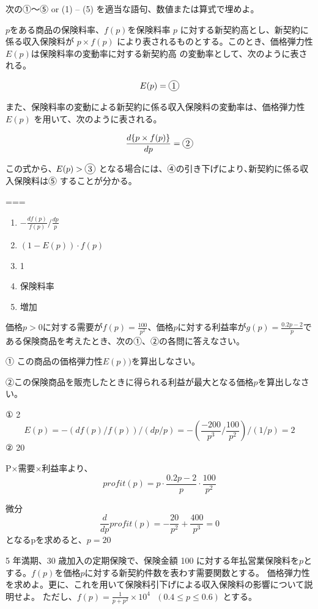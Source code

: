 \documentclass[report,gutter=10mm,fore-edge=10mm,uplatex,dvipdfmx]{jlreq}
\begin{document}

次の①～⑤ or (1) -- (5) を適当な語句、数値または算式で埋めよ。

$p$をある商品の保険料率、$f(p)$を保険料率 $p$
に対する新契約高とし、新契約に係る収入保険料が $p \times f(p)$
により表されるものとする。このとき、価格弾力性$E(p)$は保険料率の変動率に対する新契約高
の変動率として、次のように表される。

$$E(p) =  \cir{1} $$

また、保険料率の変動による新契約に係る収入保険料の変動率は、価格弾力性
$E(p)$ を用いて、次のように表される。

$$\frac{d\{p \times f(p)\} }{dp}= \cir{2}$$

この式から､ $E(p) > \cir{3}$ となる場合には、④の引き下げにより､新契約に係る収入保険料は⑤ することが分かる。

===


\begin{enumerate}
\tightlist
\item
  $-\frac{df(p)}{f(p)} / \frac{dp}{p}$
\item
  $(1-E(p))\cdot f(p)$
\item
  1
\item
  保険料率
\item
  増加
\end{enumerate}


価格$p>0$に対する需要が$f(p)=\frac{100}{p^2}$、価格$p$に対する利益率が$g(p)=\frac{0.2p-2}{p}$である保険商品を考えたとき、次の①、②の各問に答えなさい。

① この商品の価格弾力性$E(p))$を算出しなさい。 

②この保険商品を販売したときに得られる利益が最大となる価格$p$を算出しなさい。

① 2
$$ E(p) = -(df(p)/f(p)) / (dp/p) = -(\frac{-200}{p^3}/\frac{100}{p^2})/(1/p) = 2$$
② 20 

P×需要×利益率より、
$$profit(p)=p\cdot\frac{0.2p-2}{p}\cdot\frac{100}{p^2}$$

微分 $$\frac{d}{dp} profit(p) = -\frac{20}{p^2}+\frac{400}{p^3}=0$$
となるpを求めると、$p=20$



5 年満期、30 歳加入の定期保険で、保険金額 100
に対する年払営業保険料を$p$とする。$f(p)$を価格$p$に対する新契約件数を表わす需要関数とする。
価格弾力性を求めよ。更に、これを用いて保険料引下げによる収入保険料の影響について説明せよ。
ただし、$f(p)=\frac{1}{p+p^2}\times 10^4\ \ \  (0.4\leq p \leq 0.6)$
とする。
\end{document}
